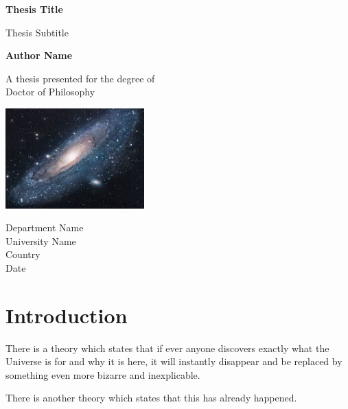\documentclass[11pt]{article} %
\begin{document}
\begin{titlepage}
    \begin{center}
        \vspace*{1cm}
        
        \Huge
        \textbf{Thesis Title}
        
        \vspace{0.5cm}
        \LARGE
        Thesis Subtitle
        
        \vspace{1.5cm}
        
        \textbf{Author Name}
        
        \vfill
        
        A thesis presented for the degree of\\
        Doctor of Philosophy
        
        \vspace{0.8cm}
        
        \includegraphics[width=0.4\textwidth]{universe}
        
        \Large
        Department Name\\
        University Name\\
        Country\\
        Date
        
    \end{center}
\end{titlepage}

\section{Introduction}

There is a theory which states that if ever anyone discovers exactly what the Universe is for and why it is here, it will instantly disappear and be replaced by something even more bizarre and inexplicable.

There is another theory which states that this has already happened.
\end{document}
